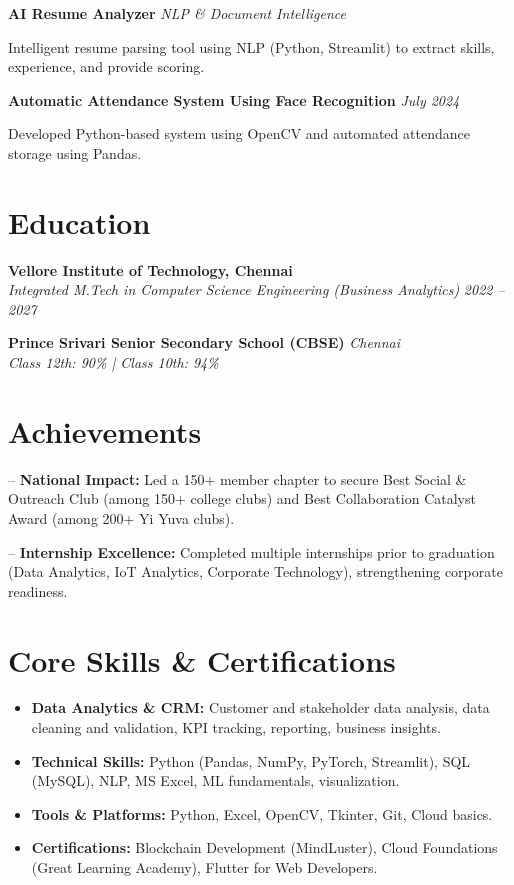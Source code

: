 \documentclass[letterpaper,10pt]{article}
\newenvironment{resume_list}{
  \vspace{-7pt}
  \begin{itemize}[itemsep=-3px, parsep=0pt, leftmargin=30pt]
}{
  \end{itemize}
}
\begin{document}
\textbf{AI Resume Analyzer} \hfill \textit{NLP \& Document Intelligence}
\begin{resume_list}
  \item Intelligent resume parsing tool using NLP (Python, Streamlit) to extract skills, experience, and provide scoring.
\end{resume_list}

\textbf{Automatic Attendance System Using Face Recognition} \hfill \textit{July 2024}
\begin{resume_list}
  \item Developed Python-based system using OpenCV and automated attendance storage using Pandas.
\end{resume_list}

\section{Education}

\textbf{Vellore Institute of Technology, Chennai} \\
\textit{Integrated M.Tech in Computer Science Engineering (Business Analytics)} \hfill \textit{2022 -- 2027}

\textbf{Prince Srivari Senior Secondary School (CBSE)} \hfill \textit{Chennai} \\
\textit{Class 12th: 90\% \quad | \quad Class 10th: 94\%}

\section{Achievements}

-- \textbf{National Impact:} Led a 150+ member chapter to secure Best Social \& Outreach Club (among 150+ college clubs) and Best Collaboration Catalyst Award (among 200+ Yi Yuva clubs).



-- \textbf{Internship Excellence:} Completed multiple internships prior to graduation (Data Analytics, IoT Analytics, Corporate Technology), strengthening corporate readiness.

\section{Core Skills \& Certifications}

\begin{itemize}
  \item \textbf{Data Analytics \& CRM:} Customer and stakeholder data analysis, data cleaning and validation, KPI tracking, reporting, business insights.
  \item \textbf{Technical Skills:} Python (Pandas, NumPy, PyTorch, Streamlit), SQL (MySQL), NLP, MS Excel, ML fundamentals, visualization.
  \item \textbf{Tools \& Platforms:} Python, Excel, OpenCV, Tkinter, Git, Cloud basics.
  \item \textbf{Certifications:} Blockchain Development (MindLuster), Cloud Foundations (Great Learning Academy), Flutter for Web Developers.
\end{itemize}
\end{document}
